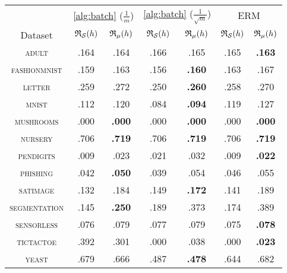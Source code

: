 \begin{tabular}{c@{\ }|@{\ }c@{\ }c@{\ }|@{\ }c@{\ }c@{\ }|@{\ }c@{\ }c@{\ }||}
\toprule
 & \multicolumn{2}{c}{\cref{alg:batch} {\small ($\frac{1}{m}$)}} & \multicolumn{2}{c}{\cref{alg:batch} {\small ($\frac{1}{\sqrt{m}}$)}} & \multicolumn{2}{c}{ERM} \\
Dataset & {\scriptsize $\mathfrak{R}_{\mathcal{S}}(h)$} & {\scriptsize $\mathfrak{R}_{\mu}(h)$} & {\scriptsize $\mathfrak{R}_{\mathcal{S}}(h)$} & {\scriptsize $\mathfrak{R}_{\mu}(h)$} & {\scriptsize $\mathfrak{R}_{\mathcal{S}}(h)$} & {\scriptsize $\mathfrak{R}_{\mu}(h)$} \\
\midrule
\textsc{\footnotesize adult} & .164 & .164 & .166 & .165 & .165 & {\bf .163} \\
\textsc{\footnotesize fashionmnist} & .159 & .163 & .156 & {\bf .160} & .163 & .167 \\
\textsc{\footnotesize letter} & .259 & .272 & .250 & {\bf .260} & .258 & .270 \\
\textsc{\footnotesize mnist} & .112 & .120 & .084 & {\bf .094} & .119 & .127 \\
\textsc{\footnotesize mushrooms} & .000 & {\bf .000} & .000 & {\bf .000} & .000 & {\bf .000} \\
\textsc{\footnotesize nursery} & .706 & {\bf .719} & .706 & {\bf .719} & .706 & {\bf .719} \\
\textsc{\footnotesize pendigits} & .009 & .023 & .021 & .032 & .009 & {\bf .022} \\
\textsc{\footnotesize phishing} & .042 & {\bf .050} & .039 & .054 & .046 & .055 \\
\textsc{\footnotesize satimage} & .132 & .184 & .149 & {\bf .172} & .141 & .189 \\
\textsc{\footnotesize segmentation} & .145 & {\bf .250} & .189 & .373 & .174 & .389 \\
\textsc{\footnotesize sensorless} & .076 & .079 & .077 & .079 & .075 & {\bf .078} \\
\textsc{\footnotesize tictactoe} & .392 & .301 & .000 & .038 & .000 & {\bf .023} \\
\textsc{\footnotesize yeast} & .679 & .666 & .487 & {\bf .478} & .644 & .682 \\
\bottomrule
\end{tabular}
